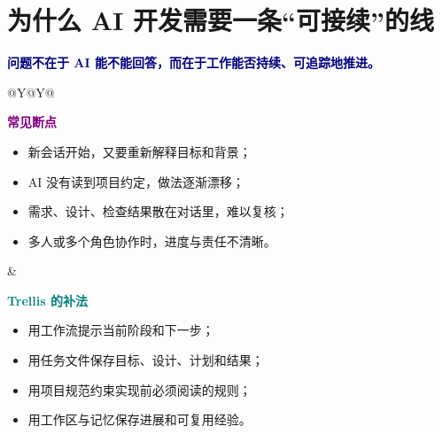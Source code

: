 \documentclass[UTF8,11pt,a4paper,fontset=none]{ctexart}
\newcommand{\minihead}[2]{\textcolor{#1}{\sffamily\bfseries\large #2}}
\begin{document}
\section{为什么 AI 开发需要一条“可接续”的线}

\begin{callout}
\minihead{Navy}{问题不在于 AI 能不能回答，而在于工作能否持续、可追踪地推进。}
\end{callout}

\vspace{4mm}
\begin{tabularx}{\textwidth}{@{}Y@{\hspace{6mm}}Y@{}}
\begin{softbox}[colback=PaleGray]
\minihead{Purple}{常见断点}\par\vspace{1mm}
\begin{itemize}
  \item 新会话开始，又要重新解释目标和背景；
  \item AI 没有读到项目约定，做法逐渐漂移；
  \item 需求、设计、检查结果散在对话里，难以复核；
  \item 多人或多个角色协作时，进度与责任不清晰。
\end{itemize}
\end{softbox}
&
\begin{softbox}[colback=PaleTeal,colframe=Teal!45]
\minihead{Teal}{Trellis 的补法}\par\vspace{1mm}
\begin{itemize}
  \item 用工作流提示当前阶段和下一步；
  \item 用任务文件保存目标、设计、计划和结果；
  \item 用项目规范约束实现前必须阅读的规则；
  \item 用工作区与记忆保存进展和可复用经验。
\end{itemize}
\end{softbox}
\end{tabularx}
\end{document}
